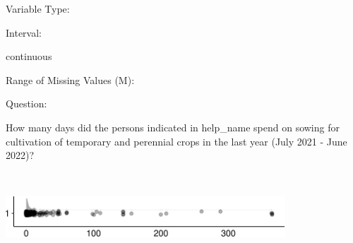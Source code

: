 \documentclass[
]{article}
\begin{document}
\begin{minipage}[t]{0.3\linewidth}

Variable Type:

\end{minipage}%
\begin{minipage}[t]{0.7\linewidth}

\end{minipage}

\begin{minipage}[t]{0.3\linewidth}

Interval:

\end{minipage}%
\begin{minipage}[t]{0.7\linewidth}

continuous

\end{minipage}

\begin{minipage}[t]{0.3\linewidth}

Range of Missing Values (M):

\end{minipage}%
\begin{minipage}[t]{0.7\linewidth}

\end{minipage}

\begin{minipage}[t]{0.3\linewidth}

Question:

\end{minipage}%
\begin{minipage}[t]{0.7\linewidth}

How many days did the persons indicated in help\_name spend on sowing
for cultivation of temporary and perennial crops in the last year (July
2021 - June 2022)?

\end{minipage}

\begin{minipage}[t]{0.3\linewidth}

~

\end{minipage}%
\begin{minipage}[t]{0.7\linewidth}

\includegraphics[width=396px]{codebook_template_files/figure-latex/q7_30_rainplot-1}

\end{minipage}
 \vspace*{-6mm} 
\end{document}
